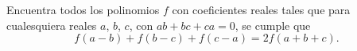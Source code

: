 Encuentra todos los polinomios $f$ con coeficientes reales tales que para cualesquiera reales $a$, $b$, $c$, con $ab+bc+ca=0$, se cumple que
\[ f(a-b) + f(b-c) + f(c-a) = 2f(a+b+c). \]